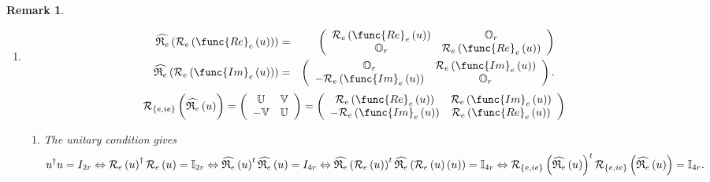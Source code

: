 \documentclass[aps,preprint]{revtex4}
\newtheorem{remark}[theorem]{Remark}
\begin{document}
\begin{remark}
\begin{enumerate}
\item 
\begin{eqnarray}
\widehat{\mathfrak{R}_{e}}\left( \mathcal{R}_{e}\left( \func{Re}_{e}\left(
u\right) \right) \right) &=&\left( 
\begin{array}{cc}
\mathcal{R}_{e}\left( \func{Re}_{e}\left( u\right) \right) & \mathbb{O}_{r}
\\ 
\mathbb{O}_{r} & \mathcal{R}_{e}\left( \func{Re}_{e}\left( u\right) \right)%
\end{array}%
\right) \\
\widehat{\mathfrak{R}_{e}}\left( \mathcal{R}_{e}\left( \func{Im}_{e}\left(
u\right) \right) \right) &=&\left( 
\begin{array}{cc}
\mathbb{O}_{r} & \mathcal{R}_{e}\left( \func{Im}_{e}\left( u\right) \right)
\\ 
-\mathcal{R}_{e}\left( \func{Im}_{e}\left( u\right) \right) & \mathbb{O}_{r}%
\end{array}%
\right) .
\end{eqnarray}%
\begin{equation}
\mathcal{R}_{\left\{ e,ie\right\} }\left( \overset{}{\widehat{\mathfrak{R}%
_{e}}\left( u\right) }\right) =\left( 
\begin{array}{cc}
\mathbb{U} & \mathbb{V} \\ 
-\mathbb{V} & \mathbb{U}%
\end{array}%
\right) =\left( 
\begin{array}{cc}
\mathcal{R}_{e}\left( \func{Re}_{e}\left( u\right) \right) & \mathcal{R}%
_{e}\left( \func{Im}_{e}\left( u\right) \right) \\ 
-\mathcal{R}_{e}\left( \func{Im}_{e}\left( u\right) \right) & \mathcal{R}%
_{e}\left( \func{Re}_{e}\left( u\right) \right)%
\end{array}%
\right)
\end{equation}

\begin{enumerate}
\item The unitary condition gives%
\begin{equation}
u^{\dagger }u=I_{2r}\Leftrightarrow \mathcal{R}_{e}\left( u\right) ^{\dagger
}\mathcal{R}_{e}\left( u\right) =\mathbb{I}_{2r}\Leftrightarrow \widehat{%
\mathfrak{R}_{e}}\left( u\right) ^{t}\widehat{\mathfrak{R}_{e}}\left(
u\right) =I_{4r}\Leftrightarrow \widehat{\mathfrak{R}_{e}}\left( \mathcal{R}%
_{e}\left( u\right) \right) ^{t}\widehat{\mathfrak{R}_{e}}\left( \mathcal{R}%
_{e}\left( u\right) \left( u\right) \right) =\mathbb{I}_{4r}\Leftrightarrow 
\mathcal{R}_{\left\{ e,ie\right\} }\left( \widehat{\mathfrak{R}_{e}}\left(
u\right) \right) ^{t}\mathcal{R}_{\left\{ e,ie\right\} }\left( \widehat{%
\mathfrak{R}_{e}}\left( u\right) \right) =\mathbb{I}_{4r}.
\end{equation}


\end{enumerate}
\end{enumerate}
\end{remark}
\end{document}

